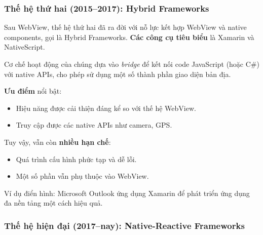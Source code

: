\begin{flushleft}
  \vspace{0.5cm}
  \subsubsection{Thế hệ thứ hai (2015–2017): Hybrid Frameworks}
  
  \begin{flushleft}
    Sau WebView, thế hệ thứ hai đã ra đời với nỗ lực kết hợp WebView và native components, 
    gọi là Hybrid Frameworks. \textbf{Các công cụ tiêu biểu} là Xamarin và NativeScript.
  \end{flushleft}

  \begin{flushleft}
    Cơ chế hoạt động của chúng dựa vào \textit{bridge} để kết nối code JavaScript (hoặc C\#) với native APIs, cho phép sử dụng một số thành phần giao diện bản địa.
    \end{flushleft}

  \begin{flushleft}
    \textbf{Ưu điểm} nổi bật:
    \setlength{\leftmargini}{1.5cm}
    \begin{itemize}
      \item Hiệu năng được cải thiện đáng kể so với thế hệ WebView.
      \item Truy cập được các native APIs như camera, GPS.
    \end{itemize}
  \end{flushleft}

  \begin{flushleft}
    Tuy vậy, vẫn còn \textbf{nhiều hạn chế}:
    \setlength{\leftmargini}{1.5cm}
    \begin{itemize}
      \item Quá trình cấu hình phức tạp và dễ lỗi.
      \item Một số phần vẫn phụ thuộc vào WebView.
    \end{itemize}
  \end{flushleft}

  \begin{flushleft}
    Ví dụ điển hình: Microsoft Outlook ứng dụng Xamarin để phát triển ứng dụng đa nền tảng một cách hiệu quả.
  \end{flushleft}

  \vspace{0.5cm}
  \subsubsection{Thế hệ hiện đại (2017–nay): Native-Reactive Frameworks}
  

\end{flushleft}
